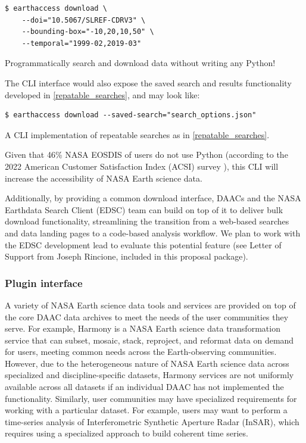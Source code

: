 \documentclass{ROSES-NASA-proposal}
\begin{document}
\begin{listing}[H]
\begin{verbatim}
$ earthaccess download \
    --doi="10.5067/SLREF-CDRV3" \
    --bounding-box="-10,20,10,50" \
    --temporal="1999-02,2019-03"
\end{verbatim}
\caption{Programmatically search and download data without writing any Python!}
\label{listing:3}
\end{listing}

The CLI interface would also expose the saved search and results functionality developed in \ref{repatable_searches}, and may look like:

\begin{listing}[H]
\begin{verbatim}
$ earthaccess download --saved-search="search_options.json" 
\end{verbatim}
\caption{A CLI implementation of repeatable searches as in  \ref{repatable_searches}.}
\label{listing:4}
\end{listing}

Given that 46\% NASA EOSDIS of users do not use Python (according to the 2022 American Customer Satisfaction Index (ACSI) survey \citealp{ACSI2022}), this CLI will increase the accessibility of NASA Earth science data.

Additionally, by providing a common download interface, DAACs and the NASA Earthdata Search Client (EDSC) team can build on top of it to deliver bulk download functionality, streamlining the transition from a web-based searches and data landing pages to a code-based analysis workflow. We plan to work with the EDSC development lead to evaluate this potential feature (see Letter of Support from Joseph Rincione, included in this proposal package). 

\subsubsection{Plugin interface} \label{plugin}

A variety of NASA Earth science data tools and services are provided on top of the core DAAC data archives to meet the needs of the user communities they serve. For example, Harmony is a NASA Earth science data transformation service that can subset, mosaic, stack, reproject, and reformat data on demand for users, meeting common needs across the Earth-observing communities. However, due to the heterogeneous nature of NASA Earth science data across specialized and discipline-specific datasets, Harmony services are not uniformly available across all datasets if an individual DAAC has not implemented the functionality. Similarly, user communities may have specialized requirements for working with a particular dataset. For example, users may want to perform a time-series analysis of Interferometric Synthetic Aperture Radar (InSAR), which requires using a specialized approach to build coherent time series.  
\end{document}
